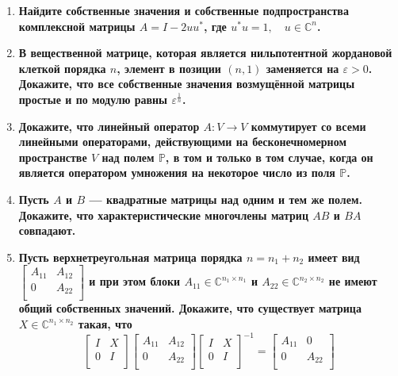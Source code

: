 \documentclass[12pt]{article} %
\begin{document}
\begin{enumerate}
    \item \textbf{Найдите собственные значения и собственные подпространства комплексной матрицы $A = I - 2uu^{*}$, где $u^{*}u = 1, \quad u \in \mathds{C}^n$.}
    \item \textbf{В вещественной матрице, которая является нильпотентной жордановой клеткой порядка $n$, элемент в позиции $(n, 1)$ заменяется на $\varepsilon > 0$. Докажите, что все собственные значения возмущённой матрицы простые и по модулю равны $\varepsilon^{\frac{1}{n}}$.}
    \item \textbf{Докажите, что линейный оператор $A: V \rightarrow V$ коммутирует со всеми линейными операторами, действующими на бесконечномерном пространстве $V$ над полем $\mathds{P}$, в том и только в том случае, когда он является оператором умножения на некоторое число из поля $\mathds{P}$.}
    \item \textbf{Пусть $A$ и $B$ --- квадратные матрицы над одним и тем же полем. Докажите, что характеристические многочлены матриц $AB$ и $BA$ совпадают.}
    \item \textbf{Пусть верхнетреугольная матрица порядка $n = n_1 + n_2$ имеет вид $
    \begin{bmatrix}
        A_{11} & A_{12}\\
        0 & A_{22}\\
    \end{bmatrix}
    $ и при этом блоки $A_{11} \in \mathds{C}^{n_1 \times n_1}$ и $A_{22} \in \mathds{C}^{n_2 \times n_2}$ не имеют общий собственных значений. Докажите, что существует матрица $X \in \mathds{C}^{n_1 \times n_2}$ такая, что
    \[
    \begin{bmatrix}
        I & X\\
        0 & I\\
    \end{bmatrix}
    \begin{bmatrix}
        A_{11} & A_{12}\\
        0 & A_{22}\\
    \end{bmatrix}
    \begin{bmatrix}
        I & X\\
        0 & I\\
    \end{bmatrix}^{-1}
    =
    \begin{bmatrix}
        A_{11} & 0\\
        0 & A_{22}\\
    \end{bmatrix}
\]}
\end{enumerate}
\end{document}
